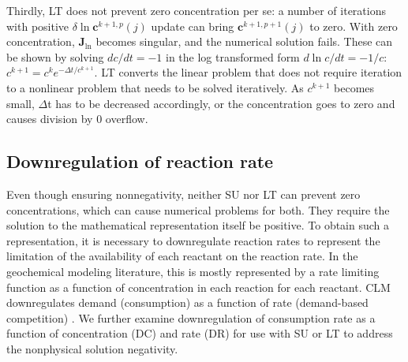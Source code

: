 \documentclass[gmd, manuscript]{copernicus}
\begin{document}
Thirdly, LT does
not prevent zero
concentration per se: a number of iterations with positive $\delta \ln
\mathbf{c}^{k+1,p} (j)$ update can bring $\mathbf{c}^{k+1,p+1} (j)$ to
zero. With zero concentration,
$\mathbf{J}_\text{ln}$ becomes singular, and the numerical solution fails.
These can be shown by solving $dc/dt=-1$ in the log transformed form $d\ln
c/dt=-1/c$: $c^{k+1}=c^k e^{-\Delta t/c^{k+1}}$. LT
converts the linear problem that does not require iteration to a nonlinear
problem that needs to be solved iteratively.
As $c^{k+1}$ becomes small, $\Delta$t has to be decreased accordingly, or the
concentration goes to zero and causes division
by 0 overflow. 

\subsection{Downregulation of reaction rate}
Even though ensuring nonnegativity, neither SU nor LT can prevent zero concentrations, which can cause numerical problems for both.
They
require the solution to the mathematical representation itself be
positive. To obtain such a representation, it is necessary to
downregulate reaction rates to represent the limitation of the availability of
each reactant on the reaction rate.  In the geochemical modeling literature,
this is mostly represented by a rate limiting function as a function of
concentration in each reaction for each reactant. CLM downregulates demand
(consumption) as a function of rate (demand-based competition) \citep{Tang2015}. We further examine
downregulation of consumption rate as a function of concentration (DC) and rate (DR)
for use with SU or LT to address the nonphysical solution negativity.
\end{document}
